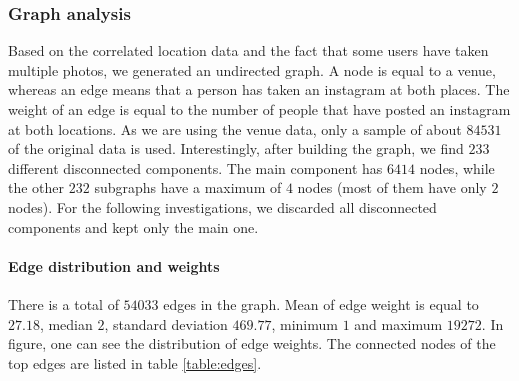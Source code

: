 \subsubsection{Graph analysis}

Based on the correlated location data and the fact that some users have taken multiple photos, we generated an undirected graph. A node is equal to a venue, whereas an edge means that a person has taken an instagram at both places. The weight of an edge is equal to the number of people that have posted an instagram at both locations. As we are using the venue data, only a sample of about $84531$ of the original data is used. Interestingly, after building the graph, we find $233$ different disconnected components. The main component has $6414$ nodes, while the other $232$ subgraphs have a maximum of $4$ nodes (most of them have only $2$ nodes). For the following investigations, we discarded all disconnected components and kept only the main one.

\paragraph{Edge distribution and weights}
There is a total of $54033$ edges in the graph. Mean of edge weight is equal to $27.18$, median $2$, standard deviation $469.77$, minimum $1$ and maximum $19272$. In figure, one can see the distribution of edge weights. The connected nodes of the top edges are listed in table \ref{table:edges}. 

